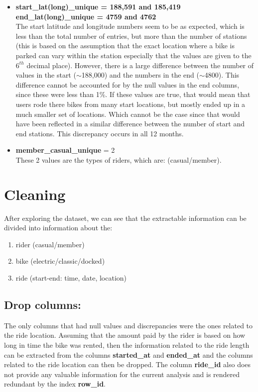 \documentclass[12pt]{article}
\begin{document}
\begin{itemize}
	\item \textbf{start\_lat(long)\_unique = 188,591 and 185,419} \\
	\textbf{end\_lat(long)\_unique = 4759 and 4762} \\
	The start latitude and longitude numbers seem to be as expected, which is less than the total number of entries, but more than the number of stations (this is based on the assumption that the exact location where a bike is parked can vary within the station especially that the values are given to the $6^{th}$ decimal place). However, there is a large difference between the number of values in the start ($\sim$188,000) and the numbers in the end ($\sim$4800). This difference cannot be accounted for by the null values in the end columns, since these were less than 1\%. If these values are true, that would mean that users rode there bikes from many start locations, but mostly ended up in a much smaller set of locations. Which cannot be the case since that would have been reflected in a similar difference between the number of start and end stations. This discrepancy occurs in all 12 months. 
	\item \textbf{member\_casual\_unique} = 2 \\
	These 2 values are the types of riders, which are: (casual/member).
	\end{itemize}

	
\section{Cleaning}
After exploring the dataset, we can see that the extractable information can be divided into information about the:
	\begin{enumerate} 
	\item rider (casual/member)
	\item bike (electric/classic/docked)
	\item ride (start-end: time, date, location)
	\end{enumerate}

\subsection{Drop columns:}
The only columns that had null values and discrepancies were the ones related to the ride location. Assuming that the amount paid by the rider is based on how long in time the bike was rented, then the information related to the ride length can be extracted from the columns \textbf{started\_at} and \textbf{ended\_at} and the columns related to the ride location can then be dropped. The column \textbf{ride\_id} also does not provide any valuable information for the current analysis and is rendered redundant by the index \textbf{row\_id}. \\
\end{document}

